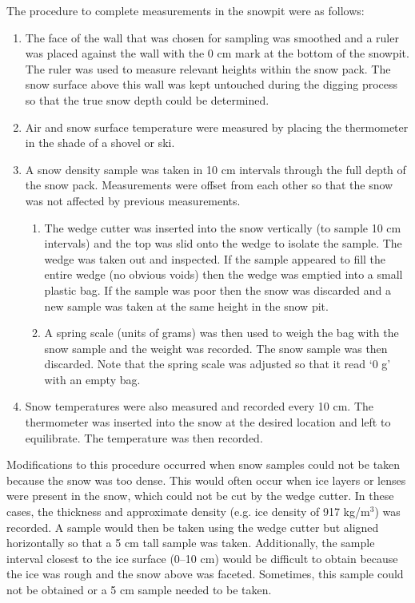 \documentclass[12pt]{article}
\begin{document}
The procedure to complete measurements in the snowpit were as follows:
\begin{enumerate}
\item The face of the wall that was chosen for sampling was smoothed and a ruler was placed against the wall with the 0 cm mark at the bottom of the snowpit. The ruler was used to measure relevant heights within the snow pack. The snow surface above this wall was kept untouched during the digging process so that the true snow depth could be determined. 
\item Air and snow surface temperature were measured by placing the thermometer in the shade of a shovel or ski. 
\item A snow density sample was taken in 10 cm intervals through the full depth of the snow pack. Measurements were offset from each other so that the snow was not affected by previous measurements. 
	\begin{enumerate}
	\item The wedge cutter was inserted into the snow vertically (to sample 10 cm intervals) and the top was slid onto the wedge to isolate the sample. The wedge was taken out and inspected. If the sample appeared to fill the entire wedge (no obvious voids) then the wedge was emptied into a small plastic bag. If the sample was poor then the snow was discarded and a new sample was taken at the same height in the snow pit. 
	\item A spring scale (units of grams) was then used to weigh the bag with the snow sample and the weight was recorded. The snow sample was then discarded. Note that the spring scale was adjusted so that it read `0 g' with an empty bag.
	\end{enumerate}
\item Snow temperatures were also measured and recorded every 10 cm. The thermometer was inserted into the snow at the desired location and left to equilibrate. The temperature was then recorded.
\end{enumerate}

Modifications to this procedure occurred when snow samples could not be taken because the snow was too dense. This would often occur when ice layers or lenses were present in the snow, which could not be cut by the wedge cutter. In these cases, the thickness and approximate density (e.g. ice density of 917 kg/m$^3$) was recorded. A sample would then be taken using the wedge cutter but aligned horizontally so that a 5 cm tall sample was taken. Additionally, the sample interval closest to the ice surface (0--10 cm) would be difficult to obtain because the ice was rough and the snow above was faceted. Sometimes, this sample could not be obtained or a 5 cm sample needed to be taken. 
\end{document}
